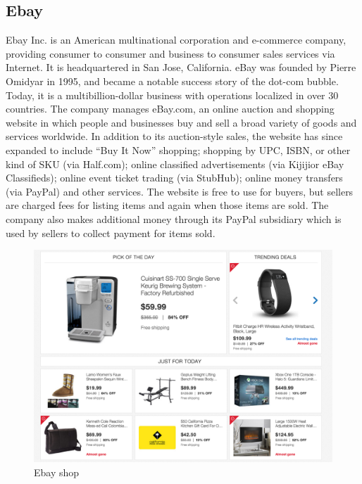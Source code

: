 \subsection{Ebay}
Ebay Inc. is an American multinational corporation and e-commerce company, providing consumer to consumer and business to consumer sales services via Internet. It is headquartered in San Jose, California. eBay was founded by Pierre Omidyar in 1995, and became a notable success story of the dot-com bubble. Today, it is a multibillion-dollar business with operations localized in over 30 countries.
\newline
The company manages eBay.com, an online auction and shopping website in which people and businesses buy and sell a broad variety of goods and services worldwide. In addition to its auction-style sales, the website has since expanded to include “Buy It Now” shopping; shopping by UPC, ISBN, or other kind of SKU (via Half.com); online classified advertisements (via Kijijior eBay Classifieds); online event ticket trading (via StubHub); online money transfers (via PayPal) and other services.
\newline
The website is free to use for buyers, but sellers are charged fees for listing items and again when those items are sold. The company also makes additional money through its PayPal subsidiary which is used by sellers to collect payment for items sold.
\begin{figure}[htb]
 \centering
 \includegraphics[width=0.9\linewidth]{images/chapter1/ex-ebay.png}\hfill
 \caption[Ebay shop]{Ebay shop}
 \label{fig:e_commerce_ebay_shop}
\end{figure}